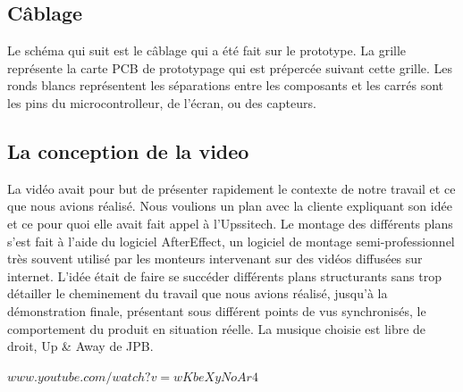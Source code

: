 \subsection{Câblage}
Le schéma qui suit est le câblage qui a été fait sur le prototype. La grille représente la carte PCB de prototypage qui est prépercée suivant cette grille. Les ronds blancs représentent les séparations entre les composants et les carrés sont les pins du microcontrolleur, de l'écran, ou des capteurs.
\begin{center}
    \makebox[\textwidth]{}
\end{center}

\subsection{La conception de la video}
La vidéo avait pour but de présenter rapidement le contexte de notre travail et ce que nous avions réalisé. Nous voulions un plan avec la cliente expliquant son idée et ce pour quoi elle avait fait appel à l’Upssitech. Le montage des différents plans s’est fait à l’aide du logiciel AfterEffect, un logiciel de montage semi-professionnel très souvent utilisé par les monteurs intervenant sur des vidéos diffusées sur internet. L’idée était de faire se succéder différents plans structurants sans trop détailler le cheminement du travail que nous avions réalisé, jusqu'à la démonstration finale, présentant sous différent points de vus synchronisés, le comportement du produit en situation réelle. La musique choisie est libre de droit, Up \& Away de JPB.

\begin{center}
  $www.youtube.com/watch?v=wKbeXyNoAr4$
\end{center}
